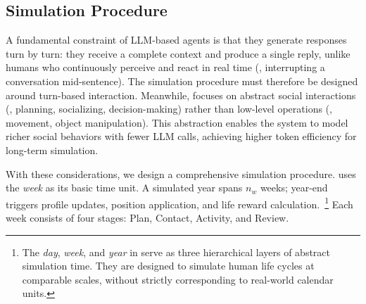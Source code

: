 \subsection{Simulation Procedure}
\label{sec:simulation_procedure}

A fundamental constraint of LLM-based agents is that they generate responses turn by turn:
they receive a complete context and produce a single reply, unlike humans who continuously perceive and react in real time (\eg, interrupting a conversation mid-sentence).
The simulation procedure must therefore be designed around turn-based interaction.
Meanwhile, \method focuses on abstract social interactions (\eg, planning, socializing, decision-making) rather than low-level operations (\eg, movement, object manipulation).
This abstraction enables the system to model richer social behaviors with fewer LLM calls, achieving higher token efficiency for long-term simulation.

With these considerations, we design a comprehensive simulation procedure.
\method uses the \textit{week} as its basic time unit.
A simulated year spans $n_w$ weeks; year-end triggers profile updates, position application, and life reward calculation.~\footnote{%
The \textit{day}, \textit{week}, and \textit{year} in \method serve as three hierarchical layers of abstract simulation time.
They are designed to simulate human life cycles at comparable scales, without strictly corresponding to real-world calendar units.}
Each week consists of four stages: Plan, Contact, Activity, and Review.




